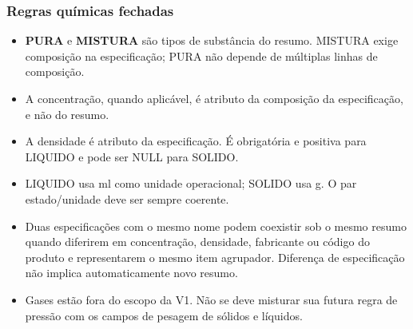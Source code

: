 \subsubsection{Regras químicas fechadas}
\begin{itemize}
    \item \textbf{PURA} e \textbf{MISTURA} são tipos de substância do resumo. MISTURA exige composição na especificação; PURA não depende de múltiplas linhas de composição.
    \item A concentração, quando aplicável, é atributo da composição da especificação, e não do resumo.
    \item A densidade é atributo da especificação. É obrigatória e positiva para LIQUIDO e pode ser NULL para SOLIDO.
    \item LIQUIDO usa ml como unidade operacional; SOLIDO usa g. O par estado/unidade deve ser sempre coerente.
    \item Duas especificações com o mesmo nome podem coexistir sob o mesmo resumo quando diferirem em concentração, densidade, fabricante ou código do produto e representarem o mesmo item agrupador. Diferença de especificação não implica automaticamente novo resumo.
    \item Gases estão fora do escopo da V1. Não se deve misturar sua futura regra de pressão com os campos de pesagem de sólidos e líquidos.
\end{itemize}


